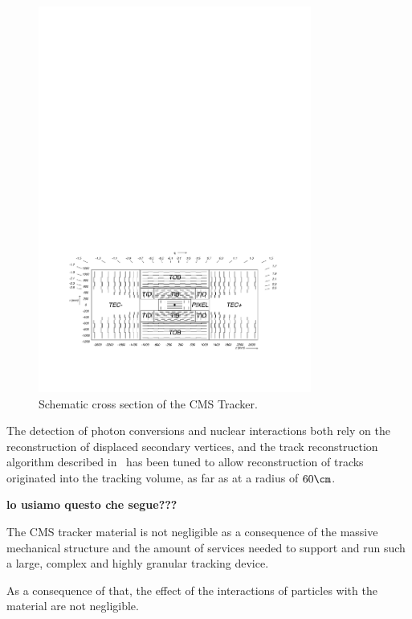 \begin{figure}[h!]
  \begin{center}
    \includegraphics[width=0.8\textwidth]{fig/general_layout.pdf}
    \caption{Schematic cross section of the CMS Tracker.}
    \label{fig:tklayout}
  \end{center}
\end{figure}


The detection of photon conversions and nuclear interactions both rely
on the reconstruction of displaced secondary vertices, and the track
reconstruction algorithm described in~\cite{TRK-10-001} has been tuned
to allow reconstruction of tracks originated into the tracking volume,
as far as at a radius of $60\cm$.




{\bf lo usiamo questo che segue???}

The CMS tracker material is not negligible as a consequence of the
massive mechanical structure and the amount of services needed to
support and run such a large, complex and highly granular tracking device.

As a consequence of that, the effect of the interactions of particles
with the material are not negligible. 


